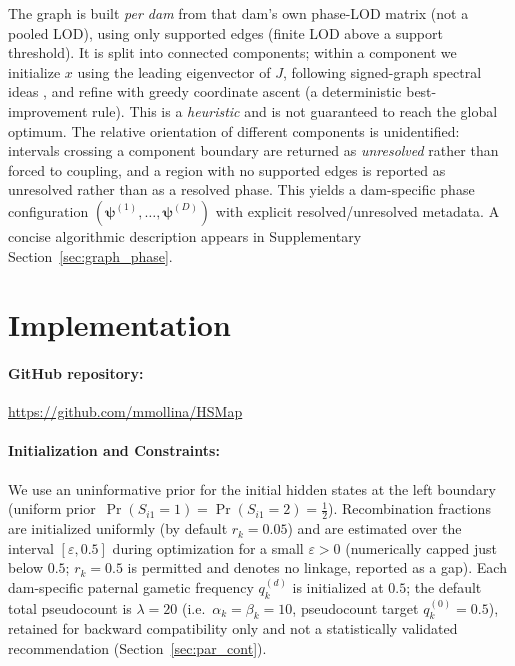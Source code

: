 \documentclass[11pt]{article}
\begin{document}
The graph is built \emph{per dam} from that dam's own phase-LOD matrix (not a pooled LOD), using only supported edges (finite LOD above a support threshold). It is split into connected components; within a component we initialize \(x\) using the leading eigenvector of \(J\), following signed-graph spectral ideas \citep{Kunegis2010SpectralVisualization}, and refine with greedy coordinate ascent (a deterministic best-improvement rule). This is a \emph{heuristic} and is not guaranteed to reach the global optimum. The relative orientation of different components is unidentified: intervals crossing a component boundary are returned as \emph{unresolved} rather than forced to coupling, and a region with no supported edges is reported as unresolved rather than as a resolved phase. This yields a dam-specific phase configuration \((\boldsymbol{\psi}^{(1)},\dots,\boldsymbol{\psi}^{(D)})\) with explicit resolved/unresolved metadata. A concise algorithmic description appears in Supplementary Section~\ref{sec:graph_phase}.


\section{Implementation}\label{sec:implementation}

\paragraph{GitHub repository:} \url{https://github.com/mmollina/HSMap}

\paragraph{Initialization and Constraints:} We use an uninformative prior for the initial hidden states at the left boundary (uniform prior $\,\Pr(S_{i1}=1)=\Pr(S_{i1}=2)=\tfrac12$). Recombination fractions are initialized uniformly (by default $r_k=0.05$) and are estimated over the interval $[\varepsilon, 0.5]$ during optimization for a small $\varepsilon > 0$ (numerically capped just below $0.5$; $r_k=0.5$ is permitted and denotes no linkage, reported as a gap). Each dam-specific paternal gametic frequency $q_k^{(d)}$ is initialized at $0.5$; the default total pseudocount is $\lambda=20$ (i.e.\ $\alpha_k=\beta_k=10$, pseudocount target $q^{(0)}_k=0.5$), retained for backward compatibility only and not a statistically validated recommendation (Section~\ref{sec:par_cont}).
\end{document}
